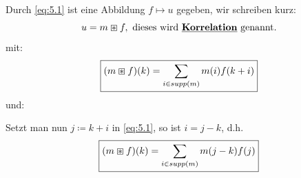 \documentclass[ngerman]{article}
\theoremstyle{plain}
\theoremstyle{definition}
\numberwithin{equation}{section}
\newcommand{\mim}[1] {
\underline{\textbf{#1\index{#1}}}
}
\begin{document}
        Durch \eqref{eq:5.1} ist eine Abbildung $f \mapsto u$ gegeben, wir schreiben kurz:
        \[u = m \boxast f, \ \text{dieses wird \mim{Korrelation} genannt.}\]
        mit:
        \begin{equation}\label{eq:5.3}
            \framebox{$\displaystyle (m \boxast f)(k) = \sum_{i \in supp(m)} m(i) f(k+i)$}
        \end{equation}
        und:
        \begin{center}
        \end{center}

        Setzt man nun $j \coloneqq  k + i$ in \eqref{eq:5.1}, so ist $i=j-k$, d.h.
        \begin{equation}\label{eq:5.4}
            \framebox{$\displaystyle (m \boxast f)(k) = \sum_{i \in supp(m)} m(j-k) f(j)$}
        \end{equation}
\end{document}
